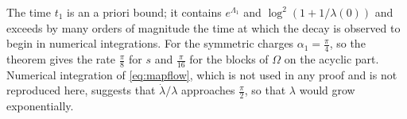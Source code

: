 \begin{remark}\label{rem:rates}
The time $t_1$ is an a priori bound; it contains $e^{\Lambda_1}$ and
$\log^2(1+1/\lambda(0))$ and exceeds by many orders of magnitude the time at
which the decay is observed to begin in numerical integrations. For the
symmetric charges $\alpha_1=\frac\pi4$, so the theorem gives the rate
$\frac\pi8$ for $s$ and $\frac\pi{16}$ for the blocks of $\Omega$ on the
acyclic part. Numerical integration of \eqref{eq:mapflow}, which is not used
in any proof and is not reproduced here, suggests that
$\dot\lambda/\lambda$ approaches $\frac\pi2$, so that $\lambda$ would grow
exponentially.
\end{remark}
